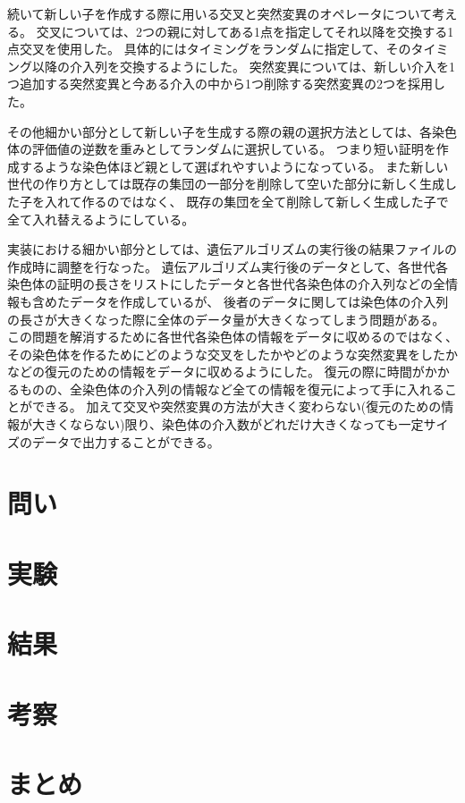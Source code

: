 \documentclass[titlepage]{jsarticle}
\begin{document}
続いて新しい子を作成する際に用いる交叉と突然変異のオペレータについて考える。
交叉については、2つの親に対してある1点を指定してそれ以降を交換する1点交叉を使用した。
具体的にはタイミングをランダムに指定して、そのタイミング以降の介入列を交換するようにした。
突然変異については、新しい介入を1つ追加する突然変異と今ある介入の中から1つ削除する突然変異の2つを採用した。

その他細かい部分として新しい子を生成する際の親の選択方法としては、各染色体の評価値の逆数を重みとしてランダムに選択している。
つまり短い証明を作成するような染色体ほど親として選ばれやすいようになっている。
また新しい世代の作り方としては既存の集団の一部分を削除して空いた部分に新しく生成した子を入れて作るのではなく、
既存の集団を全て削除して新しく生成した子で全て入れ替えるようにしている。

実装における細かい部分としては、遺伝アルゴリズムの実行後の結果ファイルの作成時に調整を行なった。
遺伝アルゴリズム実行後のデータとして、各世代各染色体の証明の長さをリストにしたデータと各世代各染色体の介入列などの全情報も含めたデータを作成しているが、
後者のデータに関しては染色体の介入列の長さが大きくなった際に全体のデータ量が大きくなってしまう問題がある。
この問題を解消するために各世代各染色体の情報をデータに収めるのではなく、その染色体を作るためにどのような交叉をしたかやどのような突然変異をしたかなどの復元のための情報をデータに収めるようにした。
復元の際に時間がかかるものの、全染色体の介入列の情報など全ての情報を復元によって手に入れることができる。
加えて交叉や突然変異の方法が大きく変わらない(復元のための情報が大きくならない)限り、染色体の介入数がどれだけ大きくなっても一定サイズのデータで出力することができる。




\section{問い}










\section{実験}










\section{結果}










\section{考察}










\section{まとめ}
\end{document}
